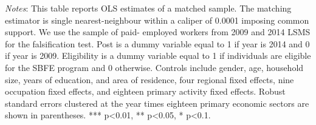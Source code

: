 \begin{landscape}
\begin{table}[H]
\begin{adjustbox}{width=\linewidth}
\begin{threeparttable}
			\begin{tablenotes}
				\setlength{}
				\footnotesize
				\item \textit{Notes}: This table reports OLS estimates of a matched sample. The matching estimator is single nearest-neighbour within a caliper of 0.0001 imposing common support. We use the sample of paid- employed workers from 2009 and 2014 LSMS for the falsification test. Post is a dummy variable equal to 1 if year is 2014 and 0 if year is 2009. Eligibility is a dummy variable equal to 1 if individuals are eligible for the SBFE program and 0 otherwise. Controls include gender, age, household size, years of education, and area of residence, four regional fixed effects, nine occupation fixed effects, and eighteen primary activity fixed effects. Robust standard errors clustered at the year times eighteen primary economic sectors are shown in parentheses. *** p<0.01, ** p<0.05, * p<0.1.
			\end{tablenotes}
		\end{threeparttable}
	\end{adjustbox}
\end{table}
\end{landscape}
